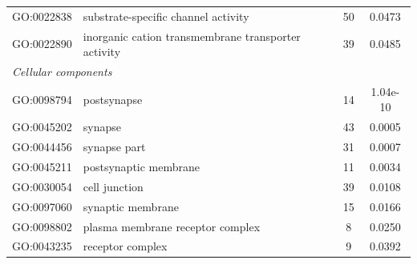 \documentclass[10pt,letterpaper]{article}
\begin{document}
\begin{table}[]
\begin{tabular}{llcc}
GO:0022838                                 & substrate-specific channel activity                        & 50                                                                                       & 0.0473                                \\
GO:0022890                                 & inorganic cation transmembrane transporter activity        & 39                                                                                       & 0.0485                                \\
\multicolumn{4}{l}{\textit{Cellular components}}                                                                                                                                                                                           \\
GO:0098794                                 & postsynapse                                                & 14                                                                                       & 1.04e-10                              \\
GO:0045202                                 & synapse                                                    & 43                                                                                       & 0.0005                                \\
GO:0044456                                 & synapse part                                               & 31                                                                                       & 0.0007                                \\
GO:0045211                                 & postsynaptic membrane                                      & 11                                                                                       & 0.0034                                \\
GO:0030054                                 & cell junction                                              & 39                                                                                       & 0.0108                                \\
GO:0097060                                 & synaptic membrane                                          & 15                                                                                       & 0.0166                                \\
GO:0098802                                 & plasma membrane receptor complex                           & 8                                                                                        & 0.0250                                \\
GO:0043235                                 & receptor complex                                           & 9                                                                                        & 0.0392                               
\end{tabular}
\end{table}
\end{document}
